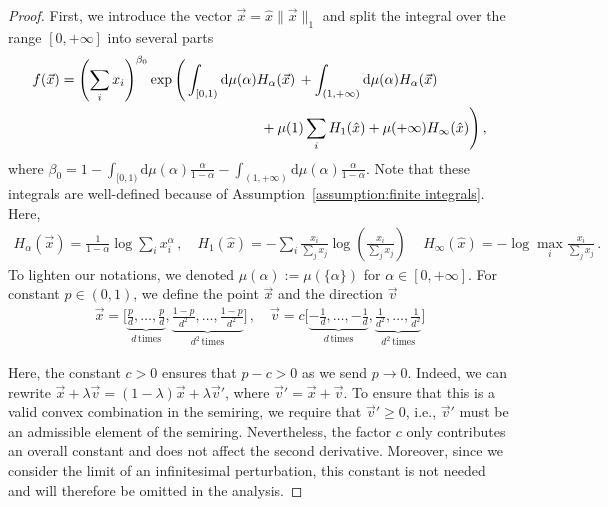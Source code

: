 \documentclass[aps,pra,11pt,onecolumn,nofootinbib,tightenlines]{revtex4-2}
\theoremstyle{definition}
\def \d {\mathrm{d}}
\begin{document}
\begin{proof}
First, we introduce the vector $\vec{x} = \hat{x}\|\vec{x}\|_1$ and split the integral over the range $[0, +\infty]$ into several parts
\begin{align}
    &f(\vec{x})= \left( \sum_i x_i \right)^{\beta_0} \exp\Bigg( 
    \int_{[0,1)} \d\mu(\alpha)  H_\alpha(\vec{x}) \, 
    + \int_{(1, +\infty)} \d\mu(\alpha)  H_\alpha(\vec{x}) \, \notag\\
    &\quad\; \qquad \qquad \qquad\qquad\qquad\hspace{5em}
    + \mu(1) \sum_i H_1(\hat{x}) + \mu(+\infty) H_\infty(\hat{x})
    \Bigg) \,,
\end{align}
where $\beta_0 = 1- \int_{[0,1)}\d \mu(\alpha) \frac{\alpha}{1-\alpha} - \int_{(1,+\infty)}\d \mu(\alpha) \frac{\alpha}{1-\alpha}$.  Note that these integrals are well-defined because of Assumption~\ref{assumption:finite integrals}. Here, 
\begin{align}
    H_\alpha(\vec{x}) = \frac{1}{1-\alpha}\log{\sum_ix_i^\alpha} \,, \quad  H_1(\hat{x}) =-\sum_i\frac{x_i}{\sum_j x_j} \log \left( \frac{x_i}{\sum_j x_j}  \right) \,\quad  H_\infty(\hat{x}) =-\log \max_i \frac{x_i}{\sum_j x_j} \,.
\end{align}
To lighten our notations, we denoted $\mu(\alpha):=\mu(\{\alpha\})$ for $\alpha\in[0,+\infty]$.
For constant $p \in (0,1)$, we define the point $\vec{x}$ and the direction $\vec{v}$
\begin{align}
\vec{x}=\bigg[\underbrace{\frac{p}{d},\ldots,\frac{p}{d}}_{d\,\textrm{times}},\underbrace{\frac{1-p}{d^2},\ldots,\frac{1-p}{d^2}}_{d^2\,\textrm{times}}\bigg] \,,
\quad 
\vec{v}=c\bigg[\underbrace{-\frac{1}{d},\ldots,-\frac{1}{d}}_{d\,\textrm{times}},\underbrace{\frac{1}{d^2},\ldots,\frac{1}{d^2}}_{d^2\,\textrm{times}}\bigg]
\end{align}

Here, the constant $c>0$ ensures that $p - c >0$ as we send $p \rightarrow 0$. Indeed, we can rewrite \(\vec{x} + \lambda \vec{v} = (1 - \lambda) \vec{x} + \lambda \vec{v}'\), where \(\vec{v}' = \vec{x} + \vec{v}\). To ensure that this is a valid convex combination in the semiring, we require that \(\vec{v}' \geq 0\), i.e., \(\vec{v}'\) must be an admissible element of the semiring. Nevertheless, the factor 
$c$ only contributes an overall constant and does not affect the second derivative. Moreover, since we consider the limit of an infinitesimal perturbation, this constant is not needed and will therefore be omitted in the analysis.


\end{proof}
\end{document}
